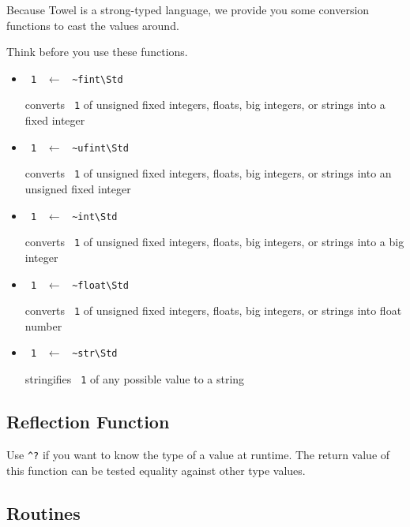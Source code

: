 \documentclass{report}
\newcommand{\mstd}[1]{\texttt{#1\textbackslash Std}}
\newcommand{\mtilde}[1]{\textasciitilde}
\newcommand{\marg}[1]{\texttt{\mtilde ~#1}}
\newcommand{\mla}[0]{~$\leftarrow$ ~}
\begin{document}
Because Towel is a strong-typed language, we provide you some conversion functions to cast the values around.

\begin{mdframed}[style=warning]
  Think before you use these functions.
\end{mdframed}

\begin{itemize}
\item \marg1 \mla \mstd{\textasciitilde fint}

converts \marg1 of unsigned fixed integers, floats, big integers, or strings into a fixed integer
\item \marg1 \mla \mstd{\textasciitilde ufint}

converts \marg1 of unsigned fixed integers, floats, big integers, or strings into an unsigned fixed integer
\item \marg1 \mla \mstd{\textasciitilde int}

converts \marg1 of unsigned fixed integers, floats, big integers, or strings into a big integer
\item \marg1 \mla \mstd{\textasciitilde float}

converts \marg1 of unsigned fixed integers, floats, big integers, or strings into float number
\item \marg1 \mla \mstd{\textasciitilde str}

stringifies \marg1 of any possible value to a string
\end{itemize}

\subsection{Reflection Function}

Use \texttt{\string^?} if you want to know the type of a value at runtime. The return value of this function can be tested equality against other type values.

\subsection{Routines}
\end{document}
